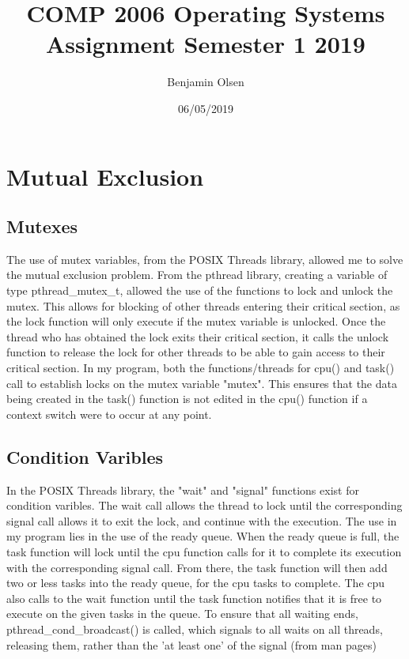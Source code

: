 \documentclass{article}
\title{COMP 2006 Operating Systems Assignment Semester 1 2019}
\date{06/05/2019}
\author{Benjamin Olsen}
\begin{document}
  \maketitle
  \newpage
  \doublespacing
  \tableofcontents
  \singlespacing
  \newpage

  \section{Mutual Exclusion}
    \subsection{Mutexes}
        The use of mutex variables, from the POSIX Threads library, allowed me to solve the mutual exclusion problem.
        From the pthread library, creating a variable of type pthread\_mutex\_t, allowed the use of the functions to lock and unlock the mutex.
        This allows for blocking of other threads entering their critical section, as the lock function will only execute if the mutex variable is unlocked.
        Once the thread who has obtained the lock exits their critical section, it calls the unlock function to release the lock for other threads to be able to gain access to their critical section.
        In my program, both the functions/threads for cpu() and task() call to establish locks on the mutex variable "mutex". This ensures that the data being created in the task() function is not edited in the cpu() function if a context switch were to occur at any point.
    \subsection{Condition Varibles}
      In the POSIX Threads library, the "wait" and "signal" functions exist for condition varibles. The wait call allows the thread to lock until the corresponding signal call allows it to exit the lock, and continue with the execution. The use in my program lies in the use of the ready queue. When the ready queue is full, the task function will lock until the cpu function calls for it to complete its execution with the corresponding signal call. From there, the task function will then add two or less tasks into the ready queue, for the cpu tasks to complete. The cpu also calls to the wait function until the task function notifies that it is free to execute on the given tasks in the queue. To ensure that all waiting ends, pthread\_cond\_broadcast() is called, which signals to all waits on all threads, releasing them, rather than the 'at least one' of the signal (from man pages)
\end{document}
